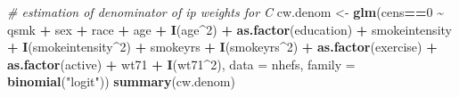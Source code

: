 \documentclass[
  10pt,
]{book}
\newenvironment{Shaded}{\begin{snugshade}}{\end{snugshade}}
\newcommand{\CommentTok}[1]{\textcolor[rgb]{0.56,0.35,0.01}{\textit{#1}}}
\newcommand{\DataTypeTok}[1]{\textcolor[rgb]{0.13,0.29,0.53}{#1}}
\newcommand{\DecValTok}[1]{\textcolor[rgb]{0.00,0.00,0.81}{#1}}
\newcommand{\KeywordTok}[1]{\textcolor[rgb]{0.13,0.29,0.53}{\textbf{#1}}}
\newcommand{\NormalTok}[1]{#1}
\newcommand{\OperatorTok}[1]{\textcolor[rgb]{0.81,0.36,0.00}{\textbf{#1}}}
\newcommand{\StringTok}[1]{\textcolor[rgb]{0.31,0.60,0.02}{#1}}
\begin{document}
\begin{Shaded}
\begin{Highlighting}[]
\CommentTok{\# estimation of denominator of ip weights for C}
\NormalTok{cw.denom \textless{}{-}}\StringTok{ }\KeywordTok{glm}\NormalTok{(cens}\OperatorTok{==}\DecValTok{0} \OperatorTok{\textasciitilde{}}\StringTok{ }\NormalTok{qsmk }\OperatorTok{+}\StringTok{ }\NormalTok{sex }\OperatorTok{+}\StringTok{ }\NormalTok{race }\OperatorTok{+}\StringTok{ }\NormalTok{age }\OperatorTok{+}\StringTok{ }\KeywordTok{I}\NormalTok{(age}\OperatorTok{\^{}}\DecValTok{2}\NormalTok{) }
                     \OperatorTok{+}\StringTok{ }\KeywordTok{as.factor}\NormalTok{(education) }\OperatorTok{+}\StringTok{ }\NormalTok{smokeintensity }\OperatorTok{+}\StringTok{ }\KeywordTok{I}\NormalTok{(smokeintensity}\OperatorTok{\^{}}\DecValTok{2}\NormalTok{) }
                     \OperatorTok{+}\StringTok{ }\NormalTok{smokeyrs }\OperatorTok{+}\StringTok{ }\KeywordTok{I}\NormalTok{(smokeyrs}\OperatorTok{\^{}}\DecValTok{2}\NormalTok{) }\OperatorTok{+}\StringTok{ }\KeywordTok{as.factor}\NormalTok{(exercise) }
                     \OperatorTok{+}\StringTok{ }\KeywordTok{as.factor}\NormalTok{(active) }\OperatorTok{+}\StringTok{ }\NormalTok{wt71 }\OperatorTok{+}\StringTok{ }\KeywordTok{I}\NormalTok{(wt71}\OperatorTok{\^{}}\DecValTok{2}\NormalTok{), }
                     \DataTypeTok{data =}\NormalTok{ nhefs, }\DataTypeTok{family =} \KeywordTok{binomial}\NormalTok{(}\StringTok{"logit"}\NormalTok{))}
\KeywordTok{summary}\NormalTok{(cw.denom)}
\end{Highlighting}
\end{Shaded}
\end{document}
